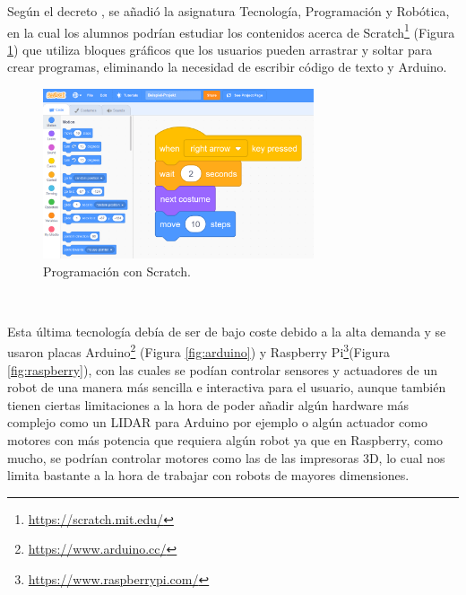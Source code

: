Según el decreto \cite{Madrid}, se añadió la asignatura Tecnología, Programación y Robótica, en la cual los alumnos podrían estudiar los contenidos acerca de Scratch\footnote{\url{https://scratch.mit.edu/}} (Figura \ref{fig:scratch}) que utiliza bloques gráficos que los usuarios pueden arrastrar y soltar para crear programas, eliminando la necesidad de escribir código de texto y Arduino. 

\begin{figure} [h!]
  \begin{center}
    \includegraphics[width=8cm]{figs/scratch.png}
  \end{center}
  \caption{Programación con Scratch.}
  \label{fig:scratch}
\end{figure}\

Esta última tecnología debía de ser de bajo coste debido a la alta demanda y se usaron placas Arduino\footnote{\url{https://www.arduino.cc/}} (Figura \ref{fig:arduino}) y Raspberry Pi\footnote{\url{https://www.raspberrypi.com/}}(Figura \ref{fig:raspberry}), con las cuales se podían controlar sensores y actuadores de un robot de una manera más sencilla e interactiva para el usuario, aunque también tienen ciertas limitaciones a la hora de poder añadir algún hardware más complejo como un LIDAR para Arduino por ejemplo o algún actuador como motores con más potencia que requiera algún robot ya que en Raspberry, como mucho, se podrían controlar motores como las de las impresoras 3D, lo cual nos limita bastante a la hora de trabajar con robots de mayores dimensiones.


